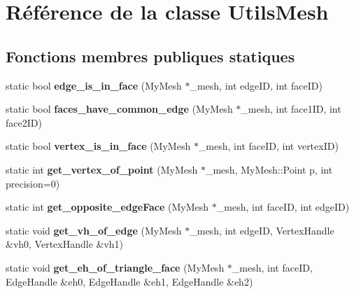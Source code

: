 \hypertarget{classUtilsMesh}{}\section{Référence de la classe Utils\+Mesh}
\label{classUtilsMesh}
\subsection*{Fonctions membres publiques statiques}
\begin{DoxyCompactItemize}
\item 
\mbox{\label{classUtilsMesh_a0d2f2fe7d612ceb4d4362c87b126c170}} 
static bool {\bfseries edge\+\_\+is\+\_\+in\+\_\+face} (My\+Mesh $\ast$\+\_\+mesh, int edge\+ID, int face\+ID)
\item 
\mbox{\label{classUtilsMesh_ace2a1887302820d51204277c7ad4b27d}} 
static bool {\bfseries faces\+\_\+have\+\_\+common\+\_\+edge} (My\+Mesh $\ast$\+\_\+mesh, int face1\+ID, int face2\+ID)
\item 
\mbox{\label{classUtilsMesh_aaedbfffbb55c461eeb612aa1811695ba}} 
static bool {\bfseries vertex\+\_\+is\+\_\+in\+\_\+face} (My\+Mesh $\ast$\+\_\+mesh, int face\+ID, int vertex\+ID)
\item 
\mbox{\label{classUtilsMesh_a2aa07d8d317c3abf913e908814de1348}} 
static int {\bfseries get\+\_\+vertex\+\_\+of\+\_\+point} (My\+Mesh $\ast$\+\_\+mesh, My\+Mesh\+::\+Point p, int precision=0)
\item 
\mbox{\label{classUtilsMesh_a884362ef422ab9153dddaf3ed4839f12}} 
static int {\bfseries get\+\_\+opposite\+\_\+edge\+Face} (My\+Mesh $\ast$\+\_\+mesh, int face\+ID, int edge\+ID)
\item 
\mbox{\label{classUtilsMesh_ab0b77c2c49bc2a758f128816d2f8cf38}} 
static void {\bfseries get\+\_\+vh\+\_\+of\+\_\+edge} (My\+Mesh $\ast$\+\_\+mesh, int edge\+ID, Vertex\+Handle \&vh0, Vertex\+Handle \&vh1)
\item 
\mbox{\label{classUtilsMesh_a5639fe5d99b8d4863a601882354783f7}} 
static void {\bfseries get\+\_\+eh\+\_\+of\+\_\+triangle\+\_\+face} (My\+Mesh $\ast$\+\_\+mesh, int face\+ID, Edge\+Handle \&eh0, Edge\+Handle \&eh1, Edge\+Handle \&eh2)

\end{DoxyCompactItemize}
